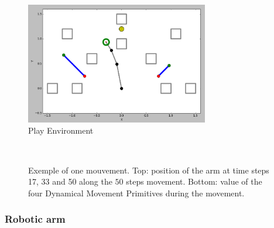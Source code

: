 \documentclass[10pt,letterpaper]{article}
\begin{document}
		\begin{figure}[h]
			\centering
			\includegraphics[width=8cm]{./include/tools.png}
			\caption{Play Environment}
			\label{env}
		\end{figure}
			
		\begin{figure}[h]
			\centering
			\\
			\hspace{-0.4cm}
			\caption{Exemple of one mouvement. Top: position of the arm at time steps 17, 33 and 50 along the $50$ steps movement. Bottom: value of the four Dynamical Movement Primitives during the movement.}
			\label{mvt}
		\end{figure}

		\subsubsection{Robotic arm}
		
\end{document}
